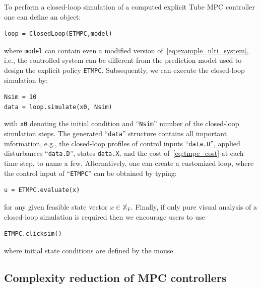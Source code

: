 \documentclass[letterpaper, 10 pt, conference]{ieeeconf}
\begin{document}
To perform a closed-loop simulation of a computed explicit Tube MPC controller one can define an object:
\begin{lstlisting}[style=Matlab-editor]
loop = ClosedLoop(ETMPC,model)
\end{lstlisting}
where \verb|model| can contain even a modified version of~\eqref{eq:example_ulti_system}, i.e., the controlled system can be different from the prediction model used to design the explicit policy \verb|ETMPC|. Subsequently, we can execute the closed-loop simulation by:
\begin{lstlisting}[style=Matlab-editor]
Nsim = 10
data = loop.simulate(x0, Nsim)
\end{lstlisting}	
with \verb|x0| denoting the initial condition and ``\verb|Nsim|'' number of the closed-loop simulation steps. The generated ``\verb|data|'' structure contains all important information, e.g., the closed-loop profiles of control inputs ``\verb|data.U|'', applied disturbances ``\verb|data.D|'', states \verb|data.X|, and the cost of~\eqref{eq:tmpc_cost} at each time step, to name a few.
Alternatively, one can create a customized loop, where the control input of ``\verb|ETMPC|'' can be obtained by typing: 
\begin{lstlisting}[style=Matlab-editor]
u = ETMPC.evaluate(x)
\end{lstlisting}
for any given feasible state vector $x\in\mathbb{X}_{\mathrm{F}}$.
%
Finally, if only pure visual analysis of a closed-loop simulation is required then we encourage users to use
\begin{lstlisting}[style=Matlab-editor]
ETMPC.clicksim()
\end{lstlisting}
where initial state conditions are defined by the mouse.
%

\subsection{Complexity reduction of MPC controllers}
\label{sec:code_mpt3lowcom}
\end{document}
